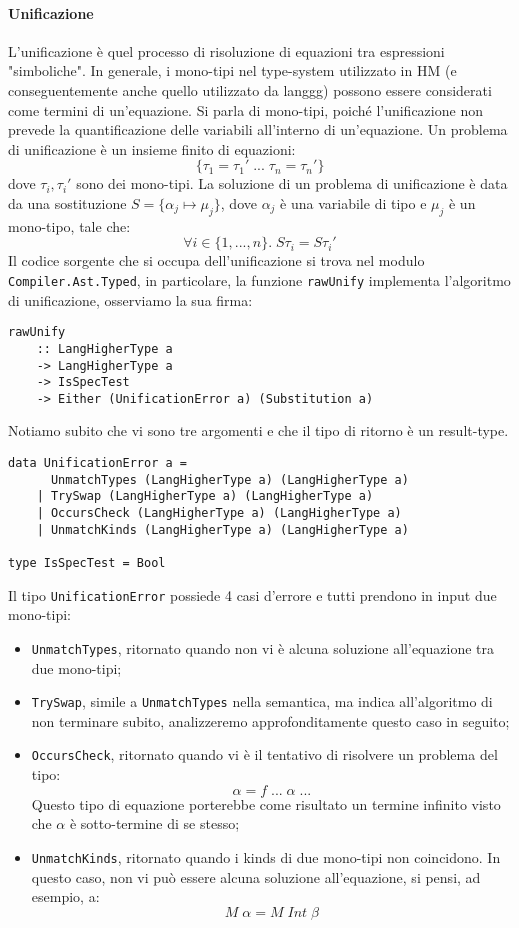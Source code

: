 \documentclass[10pt,a4paper]{article}
\begin{document}
\paragraph{Unificazione}
L'unificazione è quel processo di risoluzione di equazioni tra espressioni "simboliche". In generale, i mono-tipi nel
type-system utilizzato in HM (e conseguentemente anche quello utilizzato da langgg) possono essere considerati come
termini di un'equazione. Si parla di mono-tipi, poiché l'unificazione non prevede la quantificazione delle variabili
all'interno di un'equazione. Un problema di unificazione è un insieme finito di equazioni:
\[ \{ \tau_1 = \tau_1' \; ... \; \tau_n = \tau_n' \} \]
dove $ \tau_i, \tau_i' $ sono dei mono-tipi. La soluzione di un problema di unificazione è data da una sostituzione
$ S = \{ \alpha_j \mapsto \mu_j \} $, dove $ \alpha_j $ è una variabile di tipo e $ \mu_j $ è un mono-tipo, tale che:
\[ \forall i \in \{1, ..., n\}. \; S\tau_i = S\tau_i' \]
Il codice sorgente che si occupa dell'unificazione si trova nel modulo \texttt{Compiler.Ast.Typed}, in particolare,
la funzione \texttt{rawUnify} implementa l'algoritmo di unificazione, osserviamo la sua firma:
\begin{lstlisting}
rawUnify
    :: LangHigherType a
    -> LangHigherType a
    -> IsSpecTest
    -> Either (UnificationError a) (Substitution a)
\end{lstlisting}
Notiamo subito che vi sono tre argomenti e che il tipo di ritorno è un result-type.
\begin{lstlisting}
data UnificationError a =
      UnmatchTypes (LangHigherType a) (LangHigherType a)
    | TrySwap (LangHigherType a) (LangHigherType a)
    | OccursCheck (LangHigherType a) (LangHigherType a)
    | UnmatchKinds (LangHigherType a) (LangHigherType a)

type IsSpecTest = Bool
\end{lstlisting}
Il tipo \texttt{UnificationError} possiede 4 casi d'errore e tutti prendono in input due mono-tipi:
\begin{itemize}
    \item \texttt{UnmatchTypes}, ritornato quando non vi è alcuna soluzione all'equazione tra due mono-tipi;
    \item \texttt{TrySwap}, simile a \texttt{UnmatchTypes} nella semantica, ma indica all'algoritmo di non terminare
    subito, analizzeremo approfonditamente questo caso in seguito;
    \item \texttt{OccursCheck}, ritornato quando vi è il tentativo di risolvere un problema del tipo:
        \[ \alpha = f \; ... \; \alpha \; ...  \]
    Questo tipo di equazione porterebbe come risultato un termine infinito visto che $ \alpha $ è sotto-termine di
    se stesso;
    \item \texttt{UnmatchKinds}, ritornato quando i kinds di due mono-tipi non coincidono. In questo caso, non vi
    può essere alcuna soluzione all'equazione, si pensi, ad esempio, a:
        \[ M \; \alpha = M \; Int \; \beta \]
\end{itemize}
\end{document}
